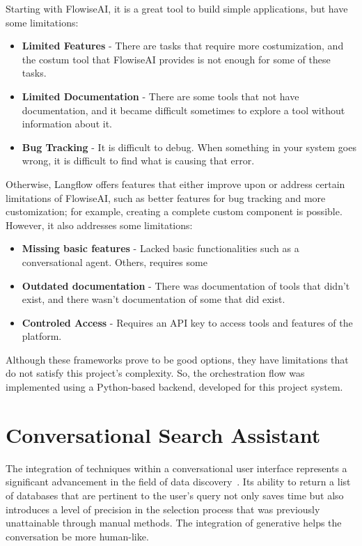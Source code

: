 Starting with FlowiseAI, it is a great tool to build simple {\llm} applications, but have some limitations:

\begin{itemize}
	\item \textbf{Limited Features} - There are tasks that require more costumization, and the costum tool that FlowiseAI provides is not enough for some of these tasks.
	\item \textbf{Limited Documentation} - There are some tools that not have documentation, and it became difficult sometimes to explore a tool without information about it.
	\item \textbf{Bug Tracking} - It is difficult to debug. When something in your system goes wrong, it is difficult to find what is causing that error. 
\end{itemize}

Otherwise, Langflow offers features that either improve upon or address certain limitations of FlowiseAI, such as better features for bug tracking and more customization; for example, creating a complete custom component is possible. However, it also addresses some limitations:

\begin{itemize}
	\item \textbf{Missing basic features} - Lacked basic functionalities such as a conversational agent. Others, requires some 
	\item \textbf{Outdated documentation} - There was documentation of tools that didn't exist, and there wasn't documentation of some that did exist. 
	\item \textbf{Controled Access} - Requires an API key to access tools and features of the platform. 
\end{itemize}


Although these frameworks prove to be good options, they have limitations that do not satisfy this project's complexity. So, the {\llm} orchestration flow was implemented using a Python-based backend, developed for this project system.


\section{Conversational Search Assistant}

The integration of {\ir} techniques within a conversational user interface represents a significant advancement in the field of data discovery~\cite{ritzel2019development}. Its ability to return a list of databases that are pertinent to the user's query not only saves time but also introduces a level of precision in the selection process that was previously unattainable through manual methods. The integration of generative {\ai} helps the conversation be more human-like. %

